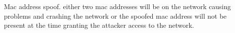 Mac address spoof. either two mac addresses will be on the network causing problems and crashing the network or the spoofed mac address will not be present at the time granting the attacker access to the network.
